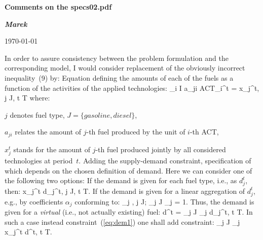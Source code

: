 \documentclass[a4paper,12pt]{article}
\begin{document}
\thispagestyle{empty}
\pagestyle{plain}
\centerline{\Large\bf Comments on the specs02.pdf}
\bigskip

\centerline{\large\bf {\em Marek}}
\bigskip

\centerline{\sc \today}

\bigskip
\bigskip

In order to assure consistency between the problem formulation and the
corresponding model, I would consider replacement of the obviously incorrect
inequality~(9) by:
\inum Equation defining the amounts of each of the fuels as a function of
the activities of the applied technologies:
	\be
	\sum_{i \in I} a_{ji} \cdot ACT_i^t = x_j^t, \quad j \in J,\; t \in T
	\ee
	where:
	\btlbs
	\item $j$ denotes fuel type, $J = \{gasoline, diesel\}$,
	\item $a_{ji}$ relates the amount of $j$-th fuel produced by the unit of
		$i$-th ACT,
	\item $x_j^t$ stands for the amount of $j$-th fuel produced jointly by all
		considered technologies at period~$t$.
	\etls
\inum Adding the supply-demand constraint, specification of which depends on the
	chosen definition of demand. Here we can consider one of the following two options:
	\inums If the demand is given for each fuel type, i.e., as $d_j^t$, then:
		\be\label{eq:dem1}
		x_j^t \ge d_j^t, \quad j \in J,\; t \in T.
		\ee
	\inums If the demand is given for a linear aggregation of $d_j^t$, e.g.,
		by coefficients $\alpha_j$ conforming to:
		 \le \alpha_j ,\; \forall j \in J; \quad \sum_{j \in J} \alpha_j = 1.
		\ee
		Thus, the demand is given for a {\em virtual} (i.e., not actually existing)
		fuel:
		\be
			d^t = \sum_{j \in J} \alpha_j \cdot d_j^t, \quad t \in T.
		\ee
		In such a case instead constraint~(\ref{eq:dem1}) one shall add constraint:
		\be
		\sum_{j \in J} \alpha_j \cdot x_j^t \ge d^t, \quad t \in T.
		\ee
	\etls
\etl
\end{document}
